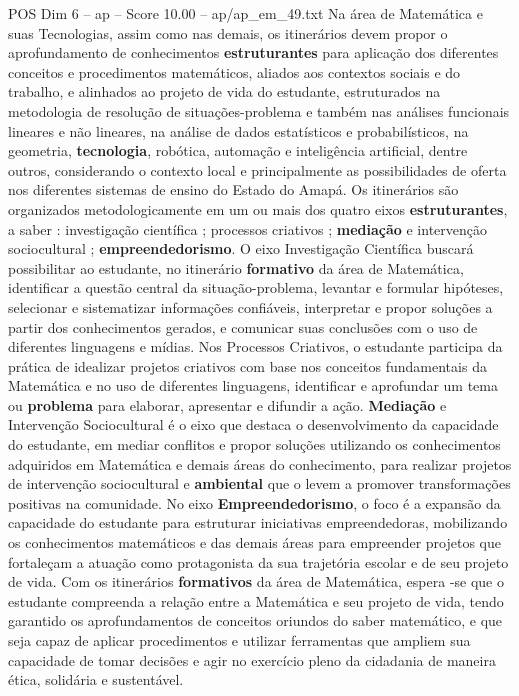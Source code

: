 \begin{textsample}{POS Dim 6 – ap – Score 10.00 – ap/ap\_em\_49.txt}
Na área de Matemática e suas Tecnologias, assim como nas demais, os itinerários devem propor o aprofundamento de conhecimentos \textbf{estruturantes} para aplicação dos diferentes conceitos e procedimentos matemáticos, aliados aos contextos sociais e do trabalho, e alinhados ao projeto de vida do estudante, estruturados na metodologia de resolução de situações-problema e também nas análises funcionais lineares e não lineares, na análise de dados estatísticos e probabilísticos, na geometria, \textbf{tecnologia}, robótica, automação e inteligência artificial, dentre outros, considerando o contexto local e principalmente as possibilidades de oferta nos diferentes sistemas de ensino do Estado do Amapá.
Os itinerários são organizados metodologicamente em um ou mais dos quatro eixos \textbf{estruturantes}, a saber : investigação científica ; processos criativos ; \textbf{mediação} e intervenção sociocultural ; \textbf{empreendedorismo}.
O eixo Investigação Científica buscará possibilitar ao estudante, no itinerário \textbf{formativo} da área de Matemática, identificar a questão central da situação-problema, levantar e formular hipóteses, selecionar e sistematizar informações confiáveis, interpretar e propor soluções a partir dos conhecimentos gerados, e comunicar suas conclusões com o uso de diferentes linguagens e mídias.
Nos Processos Criativos, o estudante participa da prática de idealizar projetos criativos com base nos conceitos fundamentais da Matemática e no uso de diferentes linguagens, identificar e aprofundar um tema ou \textbf{problema} para elaborar, apresentar e difundir a ação. \textbf{Mediação} e Intervenção Sociocultural é o eixo que destaca o desenvolvimento da capacidade do estudante, em mediar conflitos e propor soluções utilizando os conhecimentos adquiridos em Matemática e demais áreas do conhecimento, para realizar projetos de intervenção sociocultural e \textbf{ambiental} que o levem a promover transformações positivas na comunidade.
No eixo \textbf{Empreendedorismo}, o foco é a expansão da capacidade do estudante para estruturar iniciativas empreendedoras, mobilizando os conhecimentos matemáticos e das demais áreas para empreender projetos que fortaleçam a atuação como protagonista da sua trajetória escolar e de seu projeto de vida.
Com os itinerários \textbf{formativos} da área de Matemática, espera -se que o estudante compreenda a relação entre a Matemática e seu projeto de vida, tendo garantido os aprofundamentos de conceitos oriundos do saber matemático, e que seja capaz de aplicar procedimentos e utilizar ferramentas que ampliem sua capacidade de tomar decisões e agir no exercício pleno da cidadania de maneira ética, solidária e sustentável.

\end{textsample}
